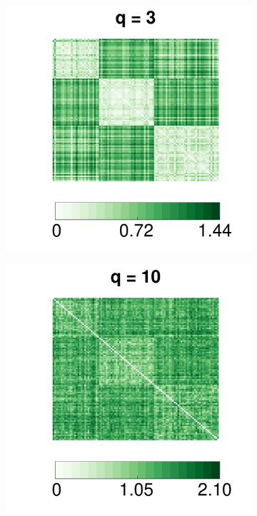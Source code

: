 \documentclass[11pt]{article}
\theoremstyle{definition}
\begin{document}
\begin{figure}[!ht]
\begin{subfigure}[b]{0.23\textwidth}
	\includegraphics[width=\textwidth]{../Figure/E3.pdf}
	\caption{}
	\label{fig:e3}
	\end{subfigure}
	\begin{subfigure}[b]{0.23\textwidth}
	\includegraphics[width=\textwidth]{../Figure/E10.pdf}

\end{subfigure}
\end{figure}
\end{document}
